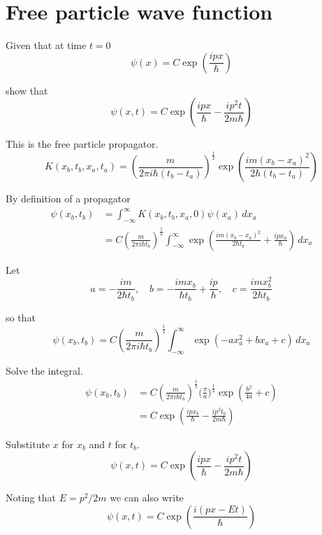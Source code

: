 


\section*{Free particle wave function}

Given that at time $t=0$
\begin{equation*}
\psi(x)=C\exp\left(\frac{ipx}{\hbar}\right)
\end{equation*}

show that
\begin{equation*}
\psi(x,t)=C\exp\left(\frac{ipx}{\hbar}-\frac{ip^2t}{2m\hbar}\right)
\end{equation*}

This is the free particle propagator.
\begin{equation*}
K(x_b,t_b,x_a,t_a)=\left(\frac{m}{2\pi i\hbar(t_b-t_a)}\right)^\frac{1}{2}
\exp\left(\frac{im(x_b-x_a)^2}{2\hbar(t_b-t_a)}\right)
\end{equation*}

By definition of a propagator
\begin{align*}
\psi(x_b,t_b)&=\int_{-\infty}^\infty K(x_b,t_b,x_a,0)\psi(x_a)\,dx_a
\\
&=C\left(\frac{m}{2\pi i\hbar t_b}\right)^\frac{1}{2}
\int_{-\infty}^\infty
\exp\left(\frac{im(x_b-x_a)^2}{2\hbar t_b}+\frac{ipx_a}{\hbar}\right)\,dx_a
\end{align*}

Let
\begin{equation*}
a=-\frac{im}{2\hbar t_b},\quad
b=-\frac{imx_b}{\hbar t_b}+\frac{ip}{\hbar},\quad
c=\frac{imx_b^2}{2\hbar t_b}
\end{equation*}

so that
\begin{equation*}
\psi(x_b,t_b)
=C\left(\frac{m}{2\pi i\hbar t_b}\right)^\frac{1}{2}
\int_{-\infty}^\infty
\exp(-ax_a^2+bx_a+c)\,dx_a
\tag{1}
\end{equation*}

Solve the integral.
\begin{align*}
\psi(x_b,t_b)&=C\left(\frac{m}{2\pi i\hbar t_b}\right)^\frac{1}{2}
\biggl(\frac{\pi}{a}\biggr)^\frac{1}{2}\exp\left(\frac{b^2}{4a}+c\right)
\\
&=C\exp\left(\frac{ipx_b}{\hbar}-\frac{ip^2t_b}{2m\hbar}\right)\tag{2}
\end{align*}

Substitute $x$ for $x_b$ and $t$ for $t_b$.
\begin{equation*}
\psi(x,t)=C\exp\left(\frac{ipx}{\hbar}-\frac{ip^2t}{2m\hbar}\right)
\end{equation*}

Noting that $E=p^2/2m$ we can also write
\begin{equation*}
\psi(x,t)=C\exp\left(\frac{i(px-Et)}{\hbar}\right)
\end{equation*}


